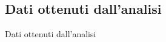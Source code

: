 \documentclass{beamer}
\begin{document}
    \subsection{Dati ottenuti dall'analisi}
    \begin{frame}{Dati ottenuti dall'analisi}
        \begin{figure}

\end{figure}
\end{frame}
\end{document}
